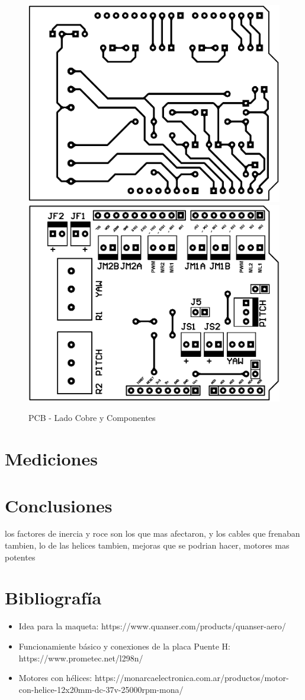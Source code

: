 \documentclass{article}
\begin{document}
\begin{figure}[H]
\centering
\includegraphics[width=0.4\linewidth]{images/cobre.png}
\includegraphics[width=0.4\linewidth]{images/componentes.png}\caption{PCB - Lado Cobre y Componentes}
\end{figure}

\newpage

\section{Mediciones}



\newpage

\section{Conclusiones}

los factores de inercia y roce son los que mas afectaron, y los cables que frenaban tambien, lo de las helices tambien, mejoras que se podrian hacer, motores mas potentes

\newpage

\section{Bibliografía}
\begin{itemize}
\item Idea para la maqueta: https://www.quanser.com/products/quanser-aero/
\item Funcionamiente básico y conexiones de la placa Puente H: https://www.prometec.net/l298n/ 
\item Motores con hélices: https://monarcaelectronica.com.ar/productos/motor-con-helice-12x20mm-dc-37v-25000rpm-mona/
\end{itemize}
\end{document}
